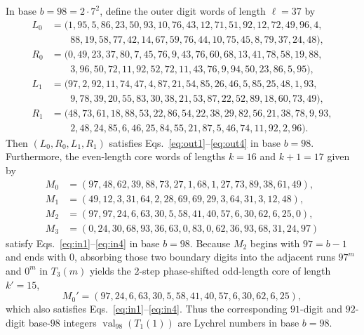 \documentclass[12pt,reqno]{article}
\DeclareMathOperator{\val}{val}
\begin{document}
\begin{theorem}\label{thm:b98}
In base $b = 98 = 2 \cdot 7^2$, define the outer digit words of length $\ell = 37$ by
\begin{align*}
L_0 &= (1, 95, 5, 86, 23, 50, 93, 10, 76, 43, 12, 71, 51, 92, 12, 72, 49, 96, 4,\\
&\phantom{=\ (} 88, 19, 58, 77, 42, 14, 67, 59, 76, 44, 10, 75, 45, 8, 79, 37, 24, 48),\\
R_0 &= (0, 49, 23, 37, 80, 7, 45, 76, 9, 43, 76, 60, 68, 13, 41, 78, 58, 19, 88,\\
&\phantom{=\ (} 3, 96, 50, 72, 11, 92, 52, 72, 11, 43, 76, 9, 94, 50, 23, 86, 5, 95),\\
L_1 &= (97, 2, 92, 11, 74, 47, 4, 87, 21, 54, 85, 26, 46, 5, 85, 25, 48, 1, 93,\\
&\phantom{=\ (} 9, 78, 39, 20, 55, 83, 30, 38, 21, 53, 87, 22, 52, 89, 18, 60, 73, 49),\\
R_1 &= (48, 73, 61, 18, 88, 53, 22, 86, 54, 22, 38, 29, 82, 56, 21, 38, 78, 9, 93,\\
&\phantom{=\ (} 2, 48, 24, 85, 6, 46, 25, 84, 55, 21, 87, 5, 46, 74, 11, 92, 2, 96).
\end{align*}
Then $(L_0, R_0, L_1, R_1)$ satisfies Eqs.~\eqref{eq:out1}--\eqref{eq:out4} in base $b = 98$. Furthermore, the even-length core words of lengths $k = 16$ and $k+1 = 17$ given by
\begin{align*}
M_0 &= (97, 48, 62, 39, 88, 73, 27, 1, 68, 1, 27, 73, 89, 38, 61, 49),\\
M_1 &= (49, 12, 3, 31, 64, 2, 28, 69, 69, 29, 3, 64, 31, 3, 12, 48),\\
M_2 &= (97, 97, 24, 6, 63, 30, 5, 58, 41, 40, 57, 6, 30, 62, 6, 25, 0),\\
M_3 &= (0, 24, 30, 68, 93, 36, 63, 0, 83, 0, 62, 36, 93, 68, 31, 24, 97)
\end{align*}
satisfy Eqs.~\eqref{eq:in1}--\eqref{eq:in4} in base $b = 98$. Because $M_2$ begins with $97 = b-1$ and ends with $0$, absorbing those two boundary digits into the adjacent runs $97^m$ and $0^m$ in $T_3(m)$ yields the $2$-step phase-shifted odd-length core of length $k' = 15$,
\begin{displaymath}
M_0' = (97, 24, 6, 63, 30, 5, 58, 41, 40, 57, 6, 30, 62, 6, 25),
\end{displaymath}
which also satisfies Eqs.~\eqref{eq:in1}--\eqref{eq:in4}. Thus the corresponding $91$-digit and $92$-digit base-$98$ integers $\val_{98}(T_1(1))$ are Lychrel numbers in base $b = 98$.
\end{theorem}
\end{document}
